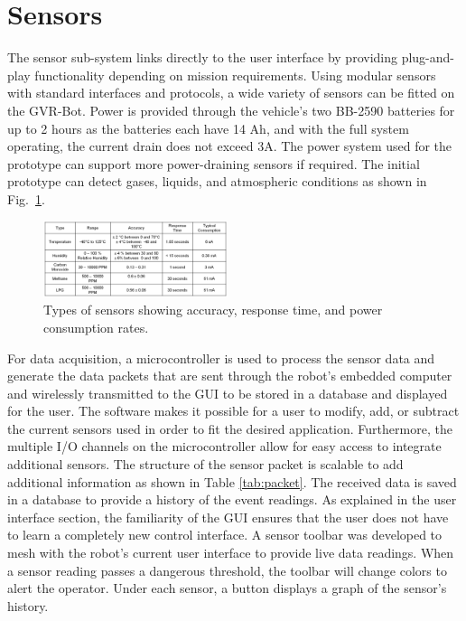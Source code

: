 \section{Sensors}\label{sec:sensors}

The sensor sub-system links directly to the user interface by providing plug-and-play functionality depending on mission requirements. Using modular sensors with standard interfaces and protocols, a wide variety of sensors can be fitted on the GVR-Bot. Power is provided through the vehicle's two BB-2590 batteries for up to 2 hours as the batteries each have 14 Ah, and with the full system operating, the current drain does not exceed 3A. The power system used for the prototype can support more power-draining sensors if required. The initial prototype can detect gases, liquids, and atmospheric conditions as shown in Fig.~\ref{fig:params}.

\begin{figure}[b]
	\centering
	\includegraphics[width=0.48\textwidth]{./pictures/sensor_params.png}
	\caption{Types of sensors showing accuracy, response time, and power consumption rates.}
	\label{fig:params}
\end{figure}

For data acquisition, a microcontroller is used to process the sensor data and generate the data packets that are sent through the robot's embedded computer and wirelessly transmitted to the GUI to be stored in a database and displayed for the user. The software makes it possible for a user to modify, add, or subtract the current sensors used in order to fit the desired application. Furthermore, the multiple I/O channels on the microcontroller allow for easy access to integrate additional sensors. The structure of the sensor packet is scalable to add additional information as shown in Table \ref{tab:packet}. The received data is saved in a database to provide a history of the event readings. As explained in the user interface section, the familiarity of the GUI ensures that the user does not have to learn a completely new control interface. A sensor toolbar was developed to mesh with the robot's current user interface to provide live data readings. When a sensor reading passes a dangerous threshold, the toolbar will change colors to alert the operator. Under each sensor, a button displays a graph of the sensor's history.

